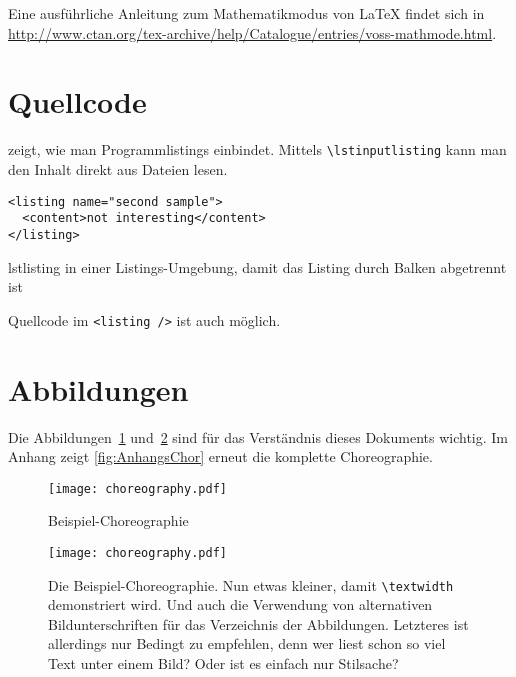 Eine ausführliche Anleitung zum Mathematikmodus von LaTeX findet sich in \url{http://www.ctan.org/tex-archive/help/Catalogue/entries/voss-mathmode.html}.

\section{Quellcode}
 zeigt, wie man Programmlistings einbindet.  Mittels \texttt{\textbackslash lstinputlisting} kann man den Inhalt direkt aus Dateien lesen.

\begin{Listing}
\begin{lstlisting}
<listing name="second sample">
  <content>not interesting</content>
</listing>
\end{lstlisting}
\caption{lstlisting in einer Listings-Umgebung, damit das Listing durch Balken abgetrennt ist}
\label{lst:ListingANDlstlisting}
\end{Listing}

Quellcode im \lstinline|<listing />| ist auch möglich.

\section{Abbildungen}
Die Abbildungen~\ref{fig:chor1} und~\ref{fig:chor2} sind für das Verständnis dieses Dokuments
wichtig. Im Anhang zeigt \vref{fig:AnhangsChor} erneut die komplette Choreographie.

\begin{figure}
  \centering
  \texttt{[image: choreography.pdf]}
  \caption{Beispiel-Choreographie}
  \label{fig:chor1}
\end{figure}

\begin{figure}
  \centering
  \texttt{[image: choreography.pdf]}
  \caption[Beispiel-Choreographie]{Die Beispiel-Choreographie. Nun etwas kleiner, damit \texttt{\textbackslash textwidth} demonstriert wird. Und auch die Verwendung von alternativen Bildunterschriften für das Verzeichnis der Abbildungen. Letzteres ist allerdings nur Bedingt zu empfehlen, denn wer liest schon so viel Text unter einem Bild? Oder ist es einfach nur Stilsache?}
  \label{fig:chor2}
\end{figure}

